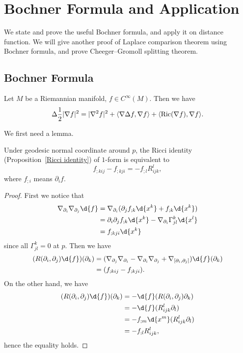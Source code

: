 \chapter{Bochner Formula and Application}
We state and prove the useful Bochner formula, and apply it on distance function.
We will give another proof of Laplace comparison theorem using Bochner formula, and prove Cheeger--Gromoll splitting theorem.

\section{Bochner Formula}

\begin{thm}
    Let $M$ be a Riemannian manifold, $f\in C^\infty(M)$. Then we have
    \[\Delta\frac{1}{2}|\nabla f|^2=|\nabla^2 f|^2+\langle\nabla\Delta f,\nabla f\rangle+\langle\operatorname{Ric}(\nabla f),\nabla f\rangle.\]
\end{thm}

We first need a lemma.
\begin{lem}
    Under geodesic normal coordinate around $p$, the Ricci identity (Proposition~\ref{Ricci identity}) of $1$-form is equivalent to
    \[f_{;kij}-f_{;kji}=-f_{;l}R^l_{ijk},\]
    where $f_{;i}$ means $\partial_if$.
\end{lem}
\begin{proof}
    First we notice that
    \begin{align*}
        \nabla_{\partial_i}\nabla_{\partial_j}\d{f}&=\nabla_{\partial_i}(\partial_jf_{;k}\d{x^k}+f_{;k}\d{x^k})\\
        &=\partial_i\partial_jf_{;k}\d{x^k}-\nabla_{\partial_i}\Gamma_{jl}^k\d{x^l}\\
        &=f_{;kji}\d{x^k}
    \end{align*}
    since all $\Gamma^k_{jl}=0$ at $p$.
    Then we have
    \begin{align*}
        (R(\partial_i,\partial_j)\d{f})(\partial_k)&=(\nabla_{\partial_j}\nabla_{\partial_i}-\nabla_{\partial_i}\nabla_{\partial_j}+\nabla_{[\partial_i,\partial_j]})\d{f}(\partial_k)\\
        &=(f_{;kij}-f_{;kji}).
    \end{align*}
    On the other hand, we have
    \begin{align*}
        (R(\partial_i,\partial_j)\d{f})(\partial_k)&=-\d{f}(R(\partial_i,\partial_j)\partial_k)\\
        &=-\d{f}(R_{ijk}^l\partial_l)\\
        &=-f_{;m}\d{x^m}(R_{ijk}^l\partial_l)\\
        &=-f_{;l}R_{ijk}^l,
    \end{align*}
    hence the equality holds.
\end{proof}

